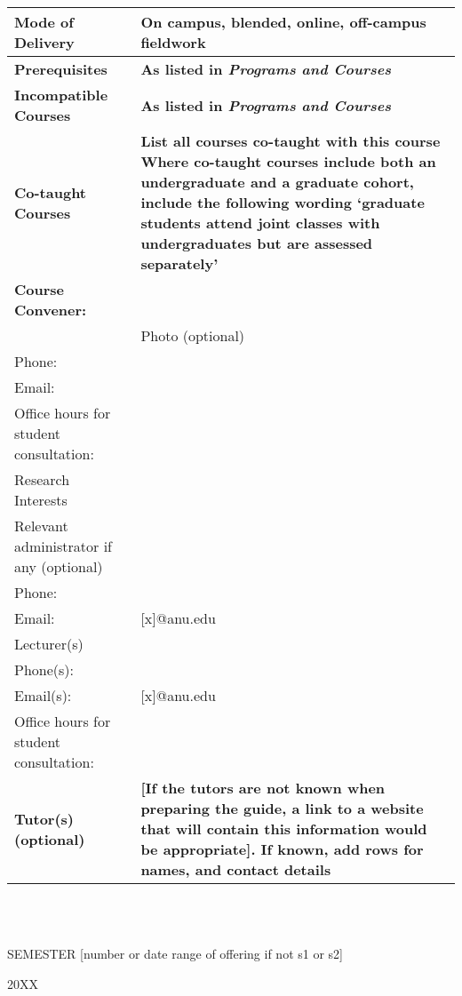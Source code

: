 \documentclass[11pt]{article}
\begin{document}
\begin{tabular}{| p{5cm} | p{10cm} |}
	\hline
	\textbf{Mode of Delivery} & \textbf{{\color{red} On campus, blended, online, off-campus fieldwork}} \\ \hline
	\textbf{Prerequisites} & \textbf{{\color{red} As listed in \textit{Programs and Courses}}} \\ \hline
	\textbf{Incompatible Courses }& \textbf{{\color{red}As listed in \textit{Programs and Courses}}} \\ \hline
	\textbf{Co-taught Courses} & \textbf{{\color{red}List all courses co-taught with this course	\newline \newline Where co-taught courses include both an undergraduate and a graduate cohort, include the following wording ‘graduate students attend joint classes with undergraduates but are assessed separately’}} \\ \hline
	\textbf{Course Convener:} & \\ \hline
	       & Photo (optional) \\ \hline %
	Phone: &  \\ \hline
	Email: &  \\ \hline
	Office hours for student \newline consultation: &  \\ \hline
	Research Interests & \\ \hline
	Relevant administrator if \newline any (optional) & \\ \hline
	Phone: & \\ \hline
	Email: & [x]@anu.edu \\ \hline
	Lecturer(s) & \\ \hline
	Phone(s): & \\ \hline
	Email(s): & [x]@anu.edu \\ \hline
	Office hours for student \newline consultation: &  \\ \hline
	\textbf{Tutor(s) (optional)} & \textbf{{\color{red}[If the tutors are not known when preparing the guide, a link to a website that will contain this
	information would be appropriate]. If known, add rows for names, and contact details}} \\ \hline
\end{tabular} \\ \\

\centerline{SEMESTER {\color{red}[number or date range of offering if not s1 or s2]}}
\centerline{20XX}
\end{document}
